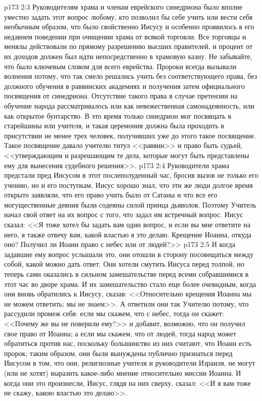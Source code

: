 \vs p173 2:3 Руководителям храма и членам еврейского синедриона было вполне уместно задать этот вопрос любому, кто позволил бы себе учить или вести себя необычным образом, что было свойственно Иисусу и особенно проявилось в его недавнем поведении при очищении храма от всякой торговли. Все торговцы и менялы действовали по прямому разрешению высших правителей, и процент от их доходов должен был идти непосредственно в храмовую казну. Не забывайте, что  было ключевым словом для всего еврейства. Пророки всегда вызывали волнения потому, что так смело решались учить без соответствующего права, без должного обучения в раввинских академиях и получения затем официального посвящения от синедриона. Отсутствие такого права в случае претензии на обучение народа рассматривалось или как невежественная самонадеянность, или как открытое бунтарство. В это время только синедрион мог посвящать в старейшины или учителя, и такая церемония должна была проходить в присутствии не менее трех человек, получивших уже до этого такое посвящение. Такое посвящение давало учителю титул <<раввин>> и право быть судьей, <<утверждающим и разрешающим те дела, которые могут быть представлены ему для вынесения судебного решения>>.
\vs p173 2:4 Руководители храма предстали пред Иисусом в этот послеполуденный час, бросив вызов не только его учению, но и его поступкам. Иисус хорошо знал, что эти же люди долгое время открыто заявляли, что его право учить было от Сатаны и что все его могущественные деяния были содеяны силой принца дьяволов. Поэтому Учитель начал свой ответ на их вопрос с того, что задал им встречный вопрос. Иисус сказал: <<Я тоже хотел бы задать вам один вопрос, и если вы мне ответите на него, я также отвечу вам, какой властью я это делаю. Крещение Иоанна, откуда оно? Получил ли Иоанн право с небес или от людей?>>
\vs p173 2:5 И когда задавшие ему вопрос услышали это, они отошли в сторону посовещаться между собой, какой можно дать ответ. Они хотели смутить Иисуса перед толпой, но теперь сами оказались в сильном замешательстве перед всеми собравшимися в этот час во дворе храма. И их замешательство стало еще более очевидным, когда они вновь обратились к Иисусу, сказав: <<Относительно крещения Иоанна мы не можем ответить; мы не знаем>>. А ответили они так Учителю потому, что рассудили промеж себя: если мы скажем, что с небес, тогда он скажет: <<Почему же вы не поверили ему?>> и добавит, возможно, что он получил свое право от Иоанна; а если мы скажем, что от людей, тогда народ может обратиться против нас, поскольку большинство из них считают, что Иоанн есть пророк; таким образом, они были вынуждены публично признаться перед Иисусом в том, что они, религиозные учителя и руководители Израиля, не могут (или не хотят) выразить какое\hyp{}либо мнение относительно миссии Иоанна. И когда они это произнесли, Иисус, глядя на них сверху, сказал: <<И я вам тоже не скажу, какою властью это делаю>>.

